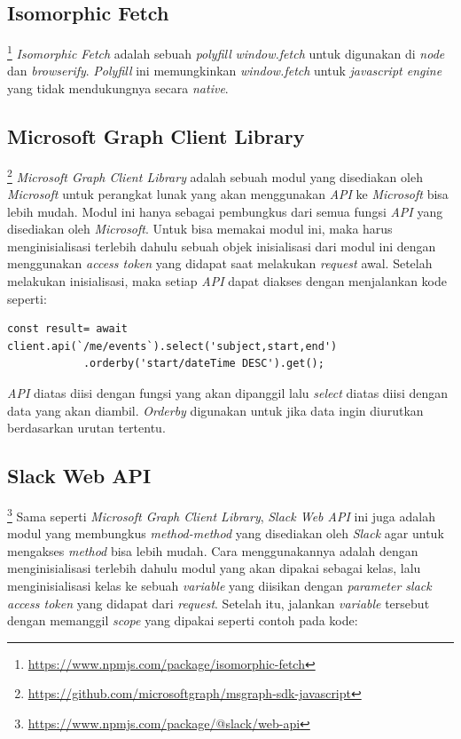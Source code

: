 \subsection{Isomorphic Fetch}\footnote{\url{https://www.npmjs.com/package/isomorphic-fetch}}
\textit{Isomorphic Fetch} adalah sebuah \textit{polyfill} \textit{window.fetch} untuk digunakan di \textit{node} dan \textit{browserify}. \textit{Polyfill} ini memungkinkan \textit{window.fetch} untuk \textit{javascript engine} yang tidak mendukungnya secara \textit{native}. 

\subsection{Microsoft Graph Client Library}\footnote{\url{https://github.com/microsoftgraph/msgraph-sdk-javascript}}
\textit{Microsoft Graph Client Library} adalah sebuah modul yang disediakan oleh \textit{Microsoft} untuk perangkat lunak yang akan menggunakan \textit{API} ke \textit{Microsoft} bisa lebih mudah. Modul ini hanya sebagai pembungkus dari semua fungsi \textit{API} yang disediakan oleh \textit{Microsoft}. Untuk bisa memakai modul ini, maka harus menginisialisasi terlebih dahulu sebuah objek inisialisasi dari modul ini dengan menggunakan \textit{access token} yang didapat saat melakukan \textit{request} awal. Setelah melakukan inisialisasi, maka setiap \textit{API} dapat diakses dengan menjalankan kode seperti:

\begin{lstlisting}
const result= await client.api(`/me/events`).select('subject,start,end')
            .orderby('start/dateTime DESC').get();
\end{lstlisting}

\textit{API} diatas diisi dengan fungsi yang akan dipanggil lalu \textit{select} diatas diisi dengan data yang akan diambil. \textit{Orderby} digunakan untuk jika data ingin diurutkan berdasarkan urutan tertentu.

\subsection{Slack Web API}\footnote{\url{https://www.npmjs.com/package/@slack/web-api}}
\label{slackWebApi}
Sama seperti \textit{Microsoft Graph Client Library}, \textit{Slack Web API} ini juga adalah modul yang membungkus \textit{method-method} yang disediakan oleh \textit{Slack} agar untuk mengakses \textit{method} bisa lebih mudah. Cara menggunakannya adalah dengan menginisialisasi terlebih dahulu modul yang akan dipakai sebagai kelas, lalu menginisialisasi kelas ke sebuah \textit{variable} yang diisikan dengan \textit{parameter slack access token} yang didapat dari \textit{request}. Setelah itu, jalankan \textit{variable} tersebut dengan memanggil \textit{scope} yang dipakai seperti contoh pada kode:

